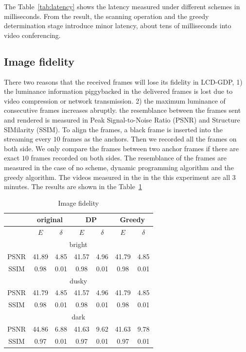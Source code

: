 The Table~\ref{tab:latency} shows the latency measured under different
schemes in milliseconds. From the result, the scanning operation and
the greedy determination stage introduce minor latency, about tens of
milliseconds into video conferencing. 

\subsection{Image fidelity}

There two reasons that the received frames will lose its fidelity in
LCD-GDP, 1) the luminance information piggybacked in the delivered
frames is lost due to video compression or network transmission. 2)
the maximum luminance of consecutive frames increases abruptly.  the
resemblance between the frames sent and rendered is measured in Peak
Signal-to-Noise Ratio (PSNR) and Structure SIMilarity (SSIM). To align
the frames, a black frame is inserted into the streaming every $10$
frames as the anchors. Then we recorded all the frames on both
side. We only compare the frames between two anchor frames if there
are exact $10$ frames recorded on both sides. The resemblance of the
frames are measured in the case of no scheme, dynamic programming
algorithm and the greedy algorithm.  The videos measured in the in the
this experiment are all $3$ minutes. The results are shown in the
Table~\ref{tab:distortion}

\begin{table}
  \centering
  \caption{Image fidelity}
  
  \begin{tabular}{|c|c|c|c|c|c|c|}
    \hline
    & \multicolumn{2}{|c|}{original} & \multicolumn{2}{|c|}{DP} & \multicolumn{2}{|c|}{Greedy} \\ \hline
    & $E$ & $\delta$ & $E$ & $\delta$ & $E$ & $\delta$ \\ \hline
    \multicolumn{7}{|c|}{bright} \\ \hline
    PSNR & 41.89 & 4.85 & 41.57 & 4.96 & 41.79 & 4.85 \\ \hline
    SSIM & 0.98 & 0.01 & 0.98 & 0.01 & 0.98 & 0.01 \\ \hline
    \multicolumn{7}{|c|}{dusky} \\ \hline
    PSNR & 41.79 & 4.85 & 41.57 & 4.96 & 41.79 & 4.85 \\ \hline
    SSIM & 0.98 & 0.01 & 0.98 & 0.01 & 0.98 & 0.01 \\ \hline
    \multicolumn{7}{|c|}{dark} \\ \hline
    PSNR & 44.86 & 6.88 & 41.63 & 9.62 & 41.63 & 9.78 \\ \hline
    SSIM & 0.97 & 0.01 & 0.97 & 0.01 & 0.97 & 0.01 \\ \hline
  \end{tabular}
  \label{tab:distortion}
\end{table}

